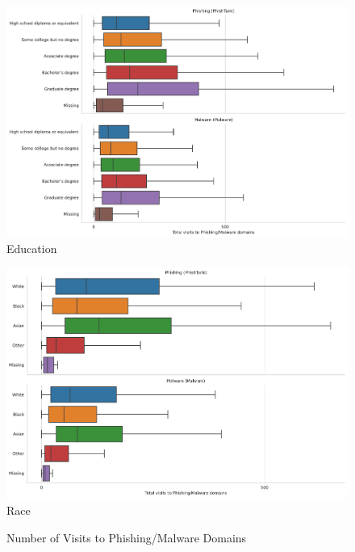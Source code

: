 \documentclass[12pt, letterpaper]{article}
\begin{document}
\begin{figure}[!htb]
\centering
\caption{Number of Visits to Phishing/Malware Domains}\label{fig:total_visits_phishing_malware}
	\begin{minipage}[b]{0.32\textwidth}
	\centering
	\label{fig:total_visits_phishing_malware_educ}
	\includegraphics[width=\textwidth]{../figs/total_visits_phishing_malware_educ.pdf}\\Education
	\end{minipage}
	\begin{minipage}[b]{0.32\textwidth}
	\centering
	\label{fig:total_visits_phishing_malware_race}
	\includegraphics[width=\textwidth]{../figs/total_visits_phishing_malware_race.pdf}\\Race
	\end{minipage}
	\begin{minipage}[b]{0.32\textwidth}
	\centering
	\label{fig:total_visits_phishing_malware_age}

\end{minipage}
\end{figure}
\end{document}
